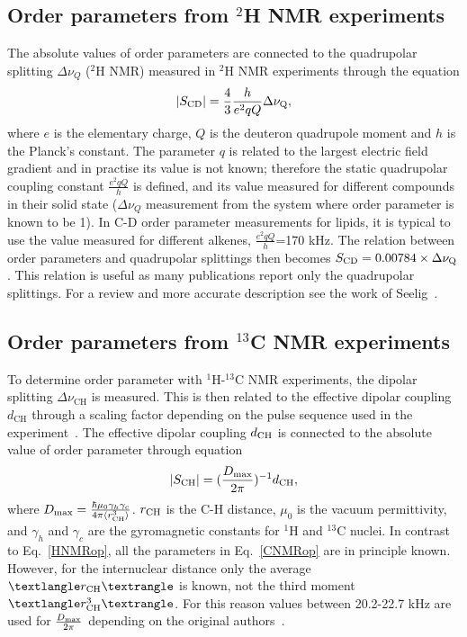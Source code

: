 \documentclass[aps,prl,superscriptaddress,twocolumn]{revtex4}
\begin{document}
\subsection{Order parameters from $^2$H NMR experiments}\label{DopSECTION}

The absolute values of order parameters are connected to the quadrupolar splitting $\Delta \nu_Q$ ($^2$H NMR) 
measured in $^2$H NMR experiments through the equation 
\begin{equation}\label{HNMRop}
|S_{{\rm CD}}|=\frac{4}{3} \frac{h}{e^2qQ} \Delta \nu_{{\rm Q}}, 
\end{equation}
where $e$ is the elementary charge, $Q$ is the deuteron quadrupole moment and $h$ is the Planck's constant. 
The parameter $q$ is related to the largest electric field gradient and in practise its value is not known; 
therefore the static quadrupolar coupling constant $\frac{e^2qQ}{h}$ is defined, and its value measured for 
different compounds in their solid state ($\Delta \nu_Q$ measurement from the system where order parameter is known to be 1). 
In C-D order parameter measurements for lipids, it is typical to 
use the value measured for different alkenes, $\frac{e^2qQ}{h}$=170 kHz. The relation between order parameters 
and quadrupolar splittings then becomes $S_{{\rm CD}}=0.00784 \times \Delta \nu_{{\rm Q}}$.
This relation is useful as many publications report only the quadrupolar splittings. For a review and more accurate description see the work of Seelig~\cite{seelig77c}.

\subsection{Order parameters from $^{13}$C NMR experiments}\label{CopSECTION}

To determine order parameter with $^1$H-$^{13}$C NMR experiments, the dipolar splitting $\Delta \nu_\mathrm{CH}$  is measured. This is then related to
the effective dipolar coupling $d_\mathrm{CH}$ through a scaling factor depending on the pulse sequence used in the 
experiment~\cite{hong95a,gross97,dvinskikh05a,ferreira13}. The effective dipolar coupling $d_{{\rm CH}}$ is 
connected to the absolute value of order parameter through equation
\begin{equation}\label{CNMRop}
|S_{{\rm CH}}|=(\frac{D_{{\rm max}}}{2\pi})^{-1}d_\mathrm{CH},
\end{equation}
where $D_{{\rm max}} = \frac{\hbar \mu_0 \gamma_h \gamma_c}{4\pi\langle r_\mathrm{CH}^3 \rangle}$. 
$r_{{\rm CH}}$ is the C-H distance, $\mu_0$ is the vacuum permittivity, and $\gamma_h$ and $\gamma_c$ are 
the gyromagnetic constants for $^1$H and $^{13}$C nuclei. In contrast to Eq.~\ref{HNMRop}, all the parameters in 
Eq.~\ref{CNMRop} are in principle known. However, for the internuclear distance only the average $⟨r_{{\rm CH}}⟩$ 
is known, not the third moment $⟨r^3_{{\rm CH}}⟩$. For this reason values between 20.2-22.7 kHz are used for
$\frac{D_{{\rm max}}}{2\pi}$ depending on the original authors~\cite{hong95a,gross97,dvinskikh05a,becker05,ferreira13,ferreira15}.
\end{document}
